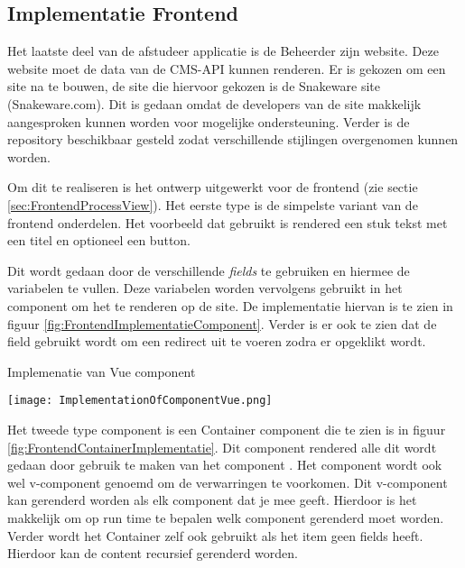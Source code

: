 \subsection{Implementatie Frontend}
Het laatste deel van de afstudeer applicatie is de \gls{Beheerder} zijn website.
Deze website moet de data van de CMS-API kunnen renderen.
Er is gekozen om een site na te bouwen, de site die hiervoor gekozen is de Snakeware site (Snakeware.com).
Dit is gedaan omdat de developers van de site makkelijk aangesproken kunnen worden voor mogelijke ondersteuning.
Verder is de repository beschikbaar gesteld zodat verschillende stijlingen overgenomen kunnen worden.

\whitespace
Om dit te realiseren is het ontwerp uitgewerkt voor de frontend (zie sectie \ref{sec:FrontendProcessView}).
Het eerste type is de simpelste variant van de frontend onderdelen. 
Het voorbeeld dat gebruikt is rendered een stuk tekst met een titel en optioneel een button.

\whitespace
Dit wordt gedaan door de verschillende \textit{fields} te gebruiken en hiermee de variabelen te vullen.
Deze variabelen worden vervolgens gebruikt in het component om het te renderen op de site.
De implementatie hiervan is te zien in figuur \ref{fig:FrontendImplementatieComponent}.
Verder is er ook te zien dat de  field gebruikt wordt om  een redirect uit te voeren zodra er opgeklikt wordt.

\whitespace
\begin{graphic}
    \captionsetup{type=figure}
    \caption{Implemenatie van Vue component}
    \texttt{[image: ImplementationOfComponentVue.png]}
    \label{fig:FrontendImplementatieComhoe dit uit in de datastructuuronent}
\end{graphic}

\whitespace
Het tweede type component is een Container component die te zien is in figuur \ref{fig:FrontendContainerImplementatie}.
Dit component rendered alle  dit wordt gedaan door gebruik te maken van het component .
Het  component wordt ook wel v-component genoemd om de verwarringen te voorkomen.
Dit v-component kan gerenderd worden als elk component dat je mee geeft.
Hierdoor is het makkelijk om op run time te bepalen welk component gerenderd moet worden.
Verder wordt het Container zelf ook gebruikt als het item geen fields heeft.
Hierdoor kan de content recursief gerenderd worden.

\newpage

